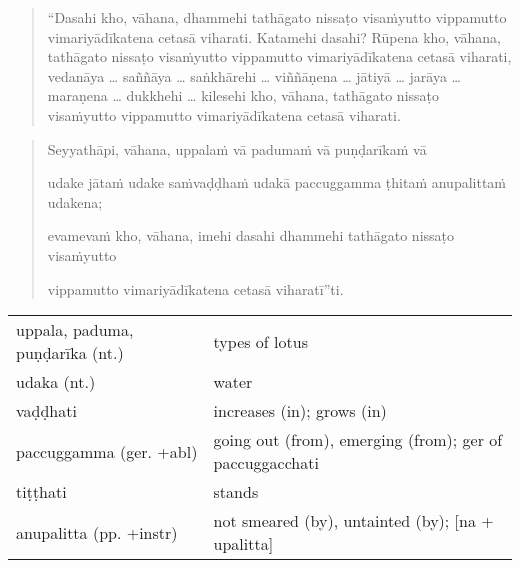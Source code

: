 \documentclass[11pt,oneside]{memoir}
\begin{document}
\begin{quote}
“Dasahi kho, vāhana, dhammehi tathāgato nissaṭo visaṁyutto vippamutto vimariyādīkatena
cetasā viharati. Katamehi dasahi? Rūpena kho, vāhana, tathāgato nissaṭo visaṁyutto
vippamutto vimariyādīkatena cetasā viharati, vedanāya \ldots{} saññāya \ldots{} saṅkhārehi \ldots{} viññāṇena
\ldots{} jātiyā \ldots{} jarāya \ldots{} maraṇena \ldots{} dukkhehi \ldots{} kilesehi kho, vāhana, tathāgato nissaṭo
visaṁyutto vippamutto vimariyādīkatena cetasā viharati.
\end{quote}

\clearpage

\begin{quote}
Seyyathāpi, vāhana, uppalaṁ vā padumaṁ vā puṇḍarīkaṁ vā

udake jātaṁ udake saṁvaḍḍhaṁ udakā paccuggamma ṭhitaṁ anupalittaṁ udakena;

evamevaṁ kho, vāhana, imehi dasahi dhammehi tathāgato nissaṭo visaṁyutto

vippamutto vimariyādīkatena cetasā viharatī”ti.
\end{quote}

\begin{longtable}{L{\colOne} L{\colTwo}}
uppala, paduma, puṇḍarīka (nt.) & types of lotus\\[0pt]
udaka (nt.) & water\\[0pt]
vaḍḍhati & increases (in); grows (in)\\[0pt]
paccuggamma (ger. +abl) & going out (from), emerging (from); ger of paccuggacchati\\[0pt]
tiṭṭhati & stands\\[0pt]
anupalitta (pp. +instr) & not smeared (by), untainted (by); [na + upalitta]\\[0pt]
\end{longtable}
\end{document}
